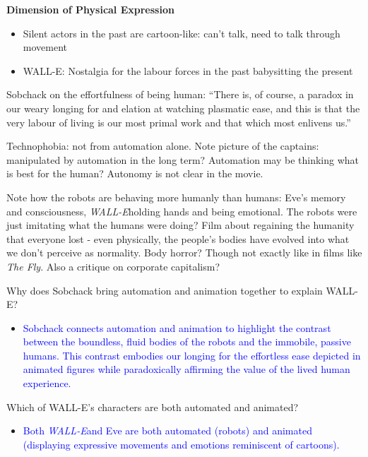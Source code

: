 \documentclass[11pt,fleqn]{book}
\begin{document}
\textbf{Dimension of Physical Expression}
\begin{itemize}
    \item Silent actors in the past are cartoon-like: can't talk, need to talk through movement
    \item WALL-E: Nostalgia for the labour forces in the past babysitting the present
\end{itemize}
\begin{remark}
    Sobchack on the effortfulness of being human: \enquote{There is, of course, a paradox in our weary longing for and elation at watching plasmatic ease, and this is that the very labour of living is our most primal work and that which most enlivens us.}
\end{remark}
\begin{remark}
    Technophobia: not from automation alone. Note picture of the captains: manipulated by automation in the long term? Automation may be thinking what is best for the human? Autonomy is not clear in the movie. 
\end{remark}
\begin{remark}
    Note how the robots are behaving more humanly than humans: Eve's memory and consciousness, \textit{WALL-E}holding hands and being emotional. The robots were just imitating what the humans were doing? Film about regaining the humanity that everyone lost - even physically, the people's bodies have evolved into what we don't perceive as normality. Body horror? Though not exactly like in films like \textit{The Fly}. Also a critique on corporate capitalism?
\end{remark}

\begin{exercise}
Why does Sobchack bring automation and animation together to explain WALL-E?
\begin{itemize}
\item \textcolor{blue}{Sobchack connects automation and animation to highlight the contrast between the boundless, fluid bodies of the robots and the immobile, passive humans. This contrast embodies our longing for the effortless ease depicted in animated figures while paradoxically affirming the value of the lived human experience.}
\end{itemize}
\end{exercise}

\begin{exercise}
Which of WALL-E's characters are both automated and animated?
\begin{itemize}
\item \textcolor{blue}{Both \textit{WALL-E}and Eve are both automated (robots) and animated (displaying expressive movements and  emotions reminiscent of cartoons).}
\end{itemize}
\end{exercise}
\end{document}
